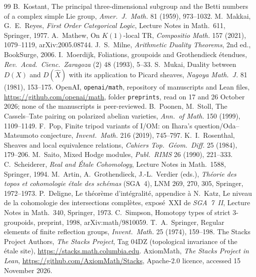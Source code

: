 \documentclass[11pt]{article}
\theoremstyle{definition}
\theoremstyle{plain}\newtheorem*{proposition}{Proposition}\theoremstyle{definition}
\begin{document}
\begin{thebibliography}{99}
 B.~Kostant, The principal three-dimensional subgroup and the Betti numbers of a complex simple Lie group, \emph{Amer.\ J.\ Math.} 81 (1959), 973--1032.
 M.~Makkai, G.~E.~Reyes, \emph{First Order Categorical Logic}, Lecture Notes in Math.~611, Springer, 1977.
 A.~Mathew, On $K(1)$-local TR, \emph{Compositio Math.} 157 (2021), 1079--1119, arXiv:2005.08744.
 J.~S.~Milne, \emph{Arithmetic Duality Theorems}, 2nd ed., BookSurge, 2006.
 I.~Moerdijk, Foliations, groupoids and Grothendieck étendues, \emph{Rev.\ Acad.\ Cienc.\ Zaragoza} (2) 48 (1993), 5--33.
 S.~Mukai, Duality between $D(X)$ and $D(\hat X)$ with its application to Picard sheaves, \emph{Nagoya Math.\ J.} 81 (1981), 153--175.
 OpenAI, \texttt{openai/math}, repository of manuscripts and Lean files, \url{https://github.com/openai/math}, folder \texttt{preprints}, read on 17 and 26 October 2026; none of the manuscripts is peer-reviewed.
 B.~Poonen, M.~Stoll, The Cassels--Tate pairing on polarized abelian varieties, \emph{Ann.\ of Math.} 150 (1999), 1109--1149.
 F.~Pop, Finite tripod variants of I/OM: on Ihara's question/Oda--Matsumoto conjecture, \emph{Invent.\ Math.} 216 (2019), 745--797.
 K.~I.~Rosenthal, Sheaves and local equivalence relations, \emph{Cahiers Top.\ Géom.\ Diff.} 25 (1984), 179--206.
 M.~Saito, Mixed Hodge modules, \emph{Publ.\ RIMS} 26 (1990), 221--333.
 C.~Scheiderer, \emph{Real and Étale Cohomology}, Lecture Notes in Math.~1588, Springer, 1994.
 M.~Artin, A.~Grothendieck, J.-L.~Verdier (eds.), \emph{Théorie des topos et cohomologie étale des schémas} (SGA~4), LNM 269, 270, 305, Springer, 1972--1973.
 P.~Deligne, Le théorème d'intégralité, appendice à N.~Katz, Le niveau de la cohomologie des intersections complètes, exposé~XXI de \emph{SGA~7~II}, Lecture Notes in Math.\ 340, Springer, 1973.
 C.~Simpson, Homotopy types of strict 3-groupoids, preprint, 1998, arXiv:math/9810059.
 T.~A.~Springer, Regular elements of finite reflection groups, \emph{Invent.\ Math.} 25 (1974), 159--198.
 The Stacks Project Authors, \emph{The Stacks Project}, Tag 04DZ (topological invariance of the étale site), \url{https://stacks.math.columbia.edu}.
 AxiomMath, \emph{The Stacks Project in Lean}, \url{https://github.com/AxiomMath/Stacks}, Apache-2.0 licence, accessed 15 November 2026.

\end{thebibliography}
\end{document}
